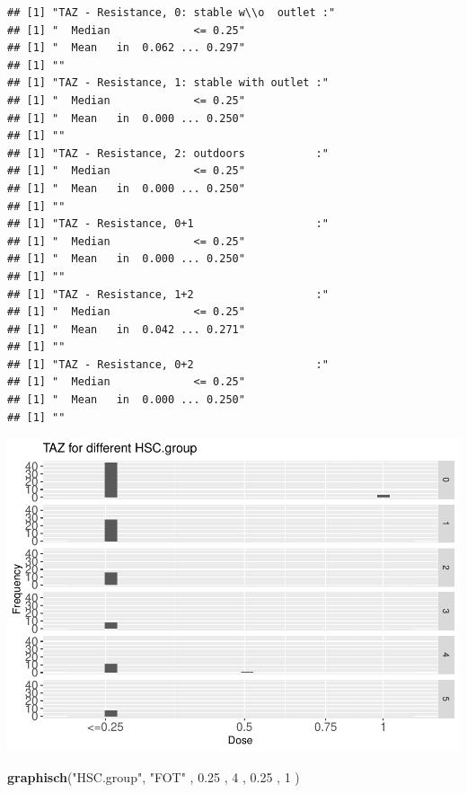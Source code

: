 \documentclass[
]{article}
\newenvironment{Shaded}{\begin{snugshade}}{\end{snugshade}}
\newcommand{\DecValTok}[1]{\textcolor[rgb]{0.00,0.00,0.81}{#1}}
\newcommand{\FloatTok}[1]{\textcolor[rgb]{0.00,0.00,0.81}{#1}}
\newcommand{\KeywordTok}[1]{\textcolor[rgb]{0.13,0.29,0.53}{\textbf{#1}}}
\newcommand{\NormalTok}[1]{#1}
\newcommand{\StringTok}[1]{\textcolor[rgb]{0.31,0.60,0.02}{#1}}
\begin{document}
\begin{verbatim}
## [1] "TAZ - Resistance, 0: stable w\\o  outlet :"
## [1] "  Median             <= 0.25"
## [1] "  Mean   in  0.062 ... 0.297"
## [1] ""
## [1] "TAZ - Resistance, 1: stable with outlet :"
## [1] "  Median             <= 0.25"
## [1] "  Mean   in  0.000 ... 0.250"
## [1] ""
## [1] "TAZ - Resistance, 2: outdoors           :"
## [1] "  Median             <= 0.25"
## [1] "  Mean   in  0.000 ... 0.250"
## [1] ""
## [1] "TAZ - Resistance, 0+1                   :"
## [1] "  Median             <= 0.25"
## [1] "  Mean   in  0.000 ... 0.250"
## [1] ""
## [1] "TAZ - Resistance, 1+2                   :"
## [1] "  Median             <= 0.25"
## [1] "  Mean   in  0.042 ... 0.271"
## [1] ""
## [1] "TAZ - Resistance, 0+2                   :"
## [1] "  Median             <= 0.25"
## [1] "  Mean   in  0.000 ... 0.250"
## [1] ""
\end{verbatim}

\includegraphics{Verteilungen_files/figure-latex/unnamed-chunk-50-1.pdf}

\begin{Shaded}
\begin{Highlighting}[]
  \KeywordTok{graphisch}\NormalTok{(}\StringTok{"HSC.group"}\NormalTok{, }\StringTok{"FOT"}\NormalTok{ , }\FloatTok{0.25}\NormalTok{ ,   }\DecValTok{4}\NormalTok{   ,   }\FloatTok{0.25}\NormalTok{ ,   }\DecValTok{1}\NormalTok{    )  }
\end{Highlighting}
\end{Shaded}
\end{document}
